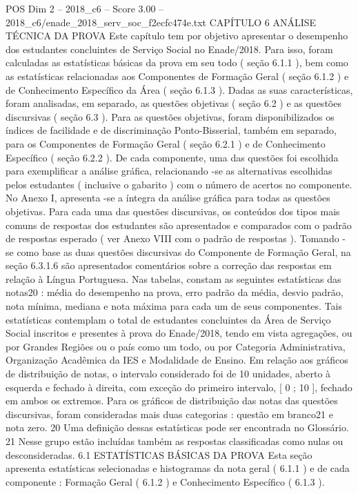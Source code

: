 \begin{textsample}{POS Dim 2 – 2018\_c6 – Score 3.00 – 2018\_c6/enade\_2018\_serv\_soc\_f2ecfc474e.txt}  \label{ex:f2_pos_191}
CAPÍTULO 6 ANÁLISE TÉCNICA DA PROVA Este capítulo tem por objetivo apresentar o desempenho dos estudantes concluintes de Serviço Social no Enade/2018.
Para isso, foram calculadas as estatísticas básicas da prova em seu todo ( seção 6.1.1 ), bem como as estatísticas relacionadas aos Componentes de Formação Geral ( seção 6.1.2 ) e de Conhecimento Específico da Área ( seção 6.1.3 ).
Dadas as suas características, foram analisadas, em separado, as questões objetivas ( seção 6.2 ) e as questões discursivas ( seção 6.3 ).
Para as questões objetivas, foram disponibilizados os índices de facilidade e de discriminação Ponto-Bisserial, também em separado, para os Componentes de Formação Geral ( seção 6.2.1 ) e de Conhecimento Específico ( seção 6.2.2 ).
De cada componente, uma das questões foi escolhida para exemplificar a análise gráfica, relacionando -se as alternativas escolhidas pelos estudantes ( inclusive o gabarito ) com o número de acertos no componente.
No Anexo I, apresenta -se a íntegra da análise gráfica para todas as questões objetivas.
Para cada uma das questões discursivas, os conteúdos dos tipos mais comuns de respostas dos estudantes são apresentados e comparados com o padrão de respostas esperado ( ver Anexo VIII com o padrão de respostas ).
Tomando -se como base as duas questões discursivas do Componente de Formação Geral, na seção 6.3.1.6 são apresentados comentários sobre a correção das respostas em relação à Língua Portuguesa.
Nas tabelas, constam as seguintes estatísticas das notas20 : média do desempenho na prova, erro padrão da média, desvio padrão, nota mínima, mediana e nota máxima para cada um de seus componentes.
Tais estatísticas contemplam o total de estudantes concluintes da Área de Serviço Social inscritos e presentes à prova do Enade/2018, tendo em vista agregações, ou por Grandes Regiões ou o país como um todo, ou por Categoria Administrativa, Organização Acadêmica da IES e Modalidade de Ensino.
Em relação aos gráficos de distribuição de notas, o intervalo considerado foi de 10 unidades, aberto à esquerda e fechado à direita, com exceção do primeiro intervalo, [ 0 ; 10 ], fechado em ambos os extremos.
Para os gráficos de distribuição das notas das questões discursivas, foram consideradas mais duas categorias : questão em branco21 e nota zero. 20 Uma definição dessas estatísticas pode ser encontrada no Glossário. 21 Nesse grupo estão incluídas também as respostas classificadas como nulas ou desconsideradas. 6.1 ESTATÍSTICAS BÁSICAS DA PROVA Esta seção apresenta estatísticas selecionadas e histogramas da nota geral ( 6.1.1 ) e de cada componente : Formação Geral ( 6.1.2 ) e Conhecimento Específico ( 6.1.3 ).

\end{textsample}
